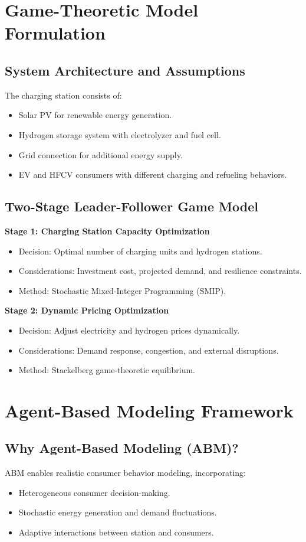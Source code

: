 \documentclass{article}
\begin{document}
\section{Game-Theoretic Model Formulation}
\subsection{System Architecture and Assumptions}
The charging station consists of:
\begin{itemize}
    \item Solar PV for renewable energy generation.
    \item Hydrogen storage system with electrolyzer and fuel cell.
    \item Grid connection for additional energy supply.
    \item EV and HFCV consumers with different charging and refueling behaviors.
\end{itemize}

\subsection{Two-Stage Leader-Follower Game Model}
\textbf{Stage 1: Charging Station Capacity Optimization}
\begin{itemize}
    \item Decision: Optimal number of charging units and hydrogen stations.
    \item Considerations: Investment cost, projected demand, and resilience constraints.
    \item Method: Stochastic Mixed-Integer Programming (SMIP).
\end{itemize}

\textbf{Stage 2: Dynamic Pricing Optimization}
\begin{itemize}
    \item Decision: Adjust electricity and hydrogen prices dynamically.
    \item Considerations: Demand response, congestion, and external disruptions.
    \item Method: Stackelberg game-theoretic equilibrium.
\end{itemize}

\section{Agent-Based Modeling Framework}
\subsection{Why Agent-Based Modeling (ABM)?}
ABM enables realistic consumer behavior modeling, incorporating:
\begin{itemize}
    \item Heterogeneous consumer decision-making.
    \item Stochastic energy generation and demand fluctuations.
    \item Adaptive interactions between station and consumers.
\end{itemize}
\end{document}
